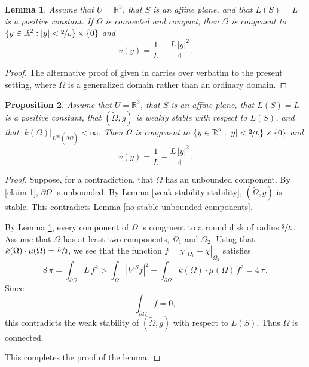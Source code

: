 \documentclass[11pt]{amsart}
\newtheorem{prop}{Proposition}
\newtheorem{lem}[prop]{Lemma}
\begin{document}
\begin{lem} \label{serrin overdetermiend}
Assume that $U=\mathbb{R}^3$,  that $S$ is an affine plane, and that $L(S)=L$ is a positive constant.	If  $\Omega$ is connected and compact, then $ \Omega$ is congruent to $\{y\in \mathbb{R}^2:|y|<\sfrac{2}{L}\}\times \{0\}$ and 
	$$
	v(y)=\frac{1}{L}-\frac{L\,|y|^2}4.
	$$
\end{lem}
\begin{proof}
	
	
	The alternative proof of \cite[Theorem 1]{JamesSerrin} given in \cite{Weinberger} carries over verbatim to the present setting, where $\Omega$ is  a generalized domain rather than an ordinary domain. 
\end{proof}
\begin{prop} \label{positive curvature limit}
Assume that $U=\mathbb{R}^3$,  that $S$ is an affine plane, that $L(S)=L$ is a positive constant,  that $(\tilde \Omega,g)$ is weakly stable with respect to $L(S)$, and that $|k(\Omega)|_{L^\infty(\tilde \partial \Omega)}<\infty$. Then $\Omega$ is congruent to $\{y\in \mathbb{R}^2:|y|<\sfrac{2}{L}\}\times \{0\}$ and  
	$$
	v(y)=\frac{1}{L}-\frac{L\,|y|^2}{4}.
	$$
\end{prop}
\begin{proof}
	Suppose, for a contradiction, that $\Omega$ has an unbounded component. By \eqref{claim 1}, $\partial \Omega$ is unbounded. 
	By Lemma \ref{weak stability stability}, $(\tilde \Omega,g)$ is stable. 
	 This contradicts Lemma \ref{no stable unbounded components}.
	
	By Lemma \ref{serrin overdetermiend}, every component of $\Omega$ is congruent to a round disk of radius $\sfrac{2}{L}$. Assume that  $\Omega$ has at least two components,  $\Omega_1$ and $\Omega_2$. Using that $k(\Omega)\cdot \mu(\Omega)=\sfrac{L}2$, we see that the function $f=\chi|_{\Omega_1}-\chi|_{\Omega_2}$ satisfies 
	$$
	8\,\pi=\int_{\tilde \partial \Omega}L\,f^2>\int_{ \Omega}|\nabla^S f|^2+\int_{\tilde \partial \Omega}k(\Omega)\cdot \mu(\Omega)\,f^2=4\,\pi.
	$$ 
	Since
	$$
	\int_{\tilde \partial \Omega}f=0,
	$$
	this contradicts the weak stability of  $(\tilde\Omega,g)$ with respect to $L(S)$. Thus $\Omega$ is connected.
	
	This completes the proof of the lemma.
\end{proof}
\end{document}
